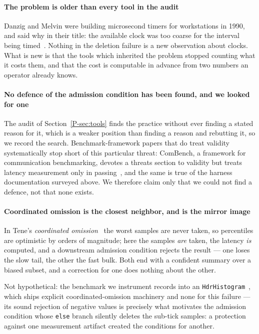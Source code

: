 \documentclass[10pt,journal,onecolumn]{IEEEtran}
\newcommand{\mainTools}{\ref{P-sec:tools}}                %
\begin{document}
\paragraph{The problem is older than every tool in the audit} Danzig and Melvin were building
microsecond timers for workstations in 1990, and said why in their title: the available clock
was too coarse for the interval being timed~\cite{danzig1990highres}. Nothing in the deletion
failure is a new observation about clocks. What is new is that the tools which inherited the
problem stopped counting what it costs them, and that the cost is computable in advance from
two numbers an operator already knows.

\paragraph{No defence of the admission condition has been found, and we looked for one} The audit of
Section~\mainTools{} finds the practice without ever finding a stated reason for it,
which is a weaker position than finding a reason and rebutting it, so we record the search.
Benchmark-framework papers that do treat validity systematically stop short of this
particular threat: ComBench, a framework for communication benchmarking, devotes a threats
section to validity but treats latency measurement only in passing~\cite{combench2021}, and
the same is true of the harness documentation surveyed above. We therefore claim only that we
could not find a defence, not that none exists.

\paragraph{Coordinated omission is the closest neighbor, and is the mirror image} In
Tene's \emph{coordinated omission}~\cite{tene2015latency} the worst samples are
never taken, so percentiles are optimistic by orders of magnitude; here the samples
\emph{are} taken, the latency \emph{is} computed, and a downstream admission condition rejects the
result --- one loses the slow tail, the other the fast bulk. Both end with a confident
summary over a biased subset, and a correction for one does nothing about the other.

\begin{sloppypar}
Not hypothetical: the benchmark we instrument records into an
\texttt{Hdr\allowbreak Histogram}~\cite{tene2015hdrhistogram}, which ships explicit
coordinated-omission machinery and none for this failure --- its sound rejection of
negative values is precisely what motivates the admission condition whose \texttt{else} branch silently
deletes the sub-tick samples: a protection against one measurement artifact created the
conditions for another.
\end{sloppypar}
\end{document}
